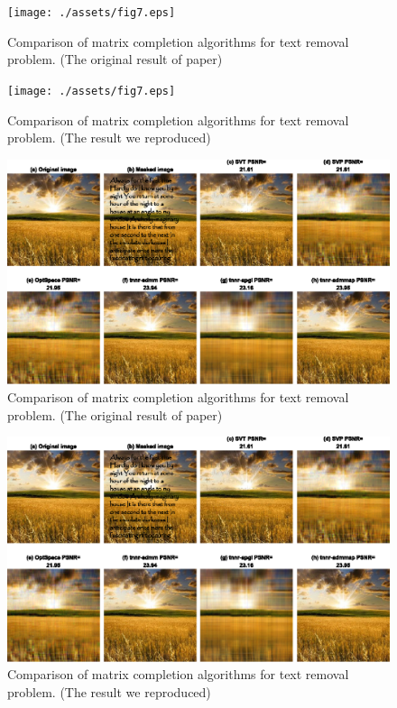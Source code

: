 \documentclass{article}
\begin{document}
{\begin{figure}[htbp]
	\centering
	\texttt{[image: ./assets/fig7.eps]}
	\caption{Comparison of matrix completion algorithms for text removal problem. (The original result of paper)}
	\label{fig7ori}
\end{figure}
\begin{figure}[htbp]
	\centering
	\texttt{[image: ./assets/fig7.eps]}
	\caption{Comparison of matrix completion algorithms for text removal problem. (The result we reproduced)}
	\label{fig7}
\end{figure}

\begin{figure}[htbp]
	\centering
	\includegraphics[width=1\textwidth]{./assets/fig8.eps}
	\caption{Comparison of matrix completion algorithms for text removal problem. (The original result of paper)}
	\label{fig8ori}
\end{figure}
\begin{figure}[htbp]
	\centering
	\includegraphics[width=1\textwidth]{./assets/fig8.eps}
	\caption{Comparison of matrix completion algorithms for text removal problem. (The result we reproduced)}
	\label{fig8}
\end{figure}


}
\end{document}
